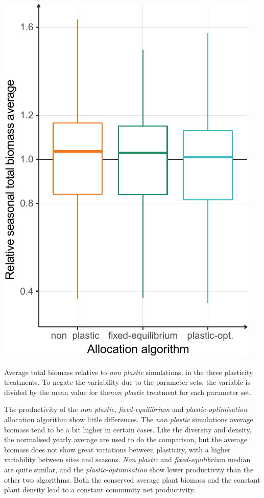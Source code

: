 \begin{marginfigure}\label{fig:total_BM_comm}
\includegraphics[width = \textwidth]{./2_PP/Figures/Comm/comm_BMtot_differences.pdf}
\caption[Average total biomass in plasticity treatments]{Average total biomass relative to  \textit{non plastic} simulations, in the three plasticity treatments.  To negate the variability due to the parameter sets, the variable is divided by the mean value for the\textit{non plastic} treatment for each parameter set.}
\end{marginfigure}

The productivity of the \textit{non plastic}, \textit{fixed-equilibrium} and \textit{plastic-optimisation} allocation algorithm show little differences. The \textit{non plastic} simulations average biomass tend to be a bit higher in certain cases. Like the diversity and density, the normalised yearly average are used to do the comparison, but the average biomass does not show great variations between plasticity, with a higher variability between sites and seasons. \textit{Non plastic} and \textit{fixed-equilibrium} median are quite similar, and the \textit{plastic-optimisation} show lower productivity than the other two algorithms. Both the conserved average plant biomass and the constant plant density lead to a constant community net productivity.

